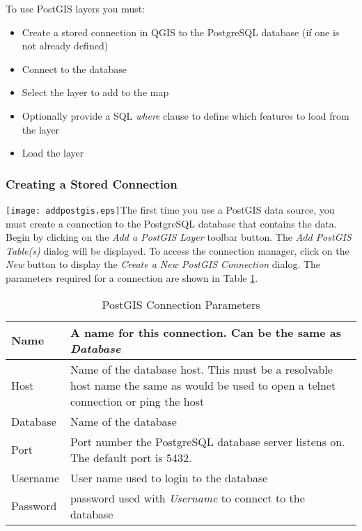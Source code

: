 To use PostGIS layers you must:

\begin{itemize}
\item Create a stored connection in QGIS to the PostgreSQL database (if one is
not already defined)
\item Connect to the database
\item Select the layer to add to the map
\item Optionally provide a SQL \textit{where} clause to define which features
to load from the layer
\item Load the layer
\end{itemize}

\subsubsection{Creating a Stored
Connection}\label{}

\texttt{[image: addpostgis.eps]}The first time
you use a PostGIS data source, you must create a connection to the PostgreSQL
database that contains the data. Begin by clicking on the \textit{Add a
PostGIS Layer} toolbar button. The \textsl{Add PostGIS Table(s)} dialog will
be displayed. To access the connection manager, click on the \textsl{New} button to display the \textsl{Create a New
PostGIS Connection} dialog. The parameters required for a connection are shown
in Table \ref{tab:postgis_connection_parms}.

\begin{table}[h]
\centering
\caption{PostGIS Connection
Parameters}\label{tab:postgis_connection_parms}\medskip
 \begin{tabular}{|l|p{5in}|}
\hline Name & A name for this connection. Can be the same as \textsl{Database}
\\
\hline Host \index{PostgreSQL!host}
& Name of the database host. This must be a resolvable host name the same as
would be used to open a telnet connection or ping the host \\
\hline Database \index{PostgreSQL!database} & Name of the database  \\
\hline Port \index{PostgreSQL!port}& Port number the PostgreSQL database
server listens on. The default port is 5432.\\
\hline Username \index{PostgreSQL!username}& User name used to login to the
database \\
\hline Password \index{PostgreSQL!password}& password used with
\textsl{Username} to connect to the database\\
\hline
\end{tabular}
\end{table}

